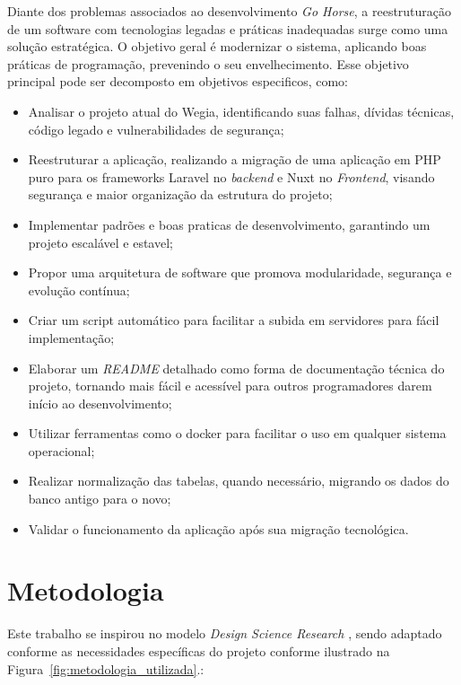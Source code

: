     Diante dos problemas associados ao desenvolvimento \textit{Go Horse}, a reestruturação de um software com tecnologias legadas e práticas inadequadas surge como uma solução estratégica. O objetivo geral é modernizar o sistema, aplicando boas práticas de programação, prevenindo o seu envelhecimento. Esse objetivo principal pode ser decomposto em objetivos especificos, como:

    \begin{itemize}
        \item Analisar o projeto atual do Wegia, identificando suas falhas, dívidas técnicas, código legado e vulnerabilidades de segurança;
        \item Reestruturar a aplicação, realizando a migração de uma aplicação em PHP puro para os frameworks Laravel no \textit{backend} e Nuxt no \textit{Frontend}, visando segurança e maior organização da estrutura do projeto;
        \item Implementar padrões e boas praticas de desenvolvimento, garantindo um projeto escalável e estavel;
        \item Propor uma arquitetura de software que promova modularidade, segurança e evolução contínua;
        \item Criar um script automático para facilitar a subida em servidores para fácil implementação;
        \item Elaborar um \textit{README} detalhado como forma de documentação técnica do projeto, tornando mais fácil e acessível para outros programadores darem início ao desenvolvimento;
        \item Utilizar ferramentas como o docker para facilitar o uso em qualquer sistema operacional;
        \item Realizar normalização das tabelas, quando necessário, migrando os dados do banco antigo para o novo;
        \item Validar o funcionamento da aplicação após sua migração tecnológica.
    \end{itemize}


    \section{Metodologia}

    Este trabalho se inspirou no modelo \textit{Design Science Research} \cite[]{pimentel2020dsr}, sendo adaptado conforme as necessidades específicas do projeto conforme ilustrado na Figura~\ref{fig:metodologia_utilizada}.:


